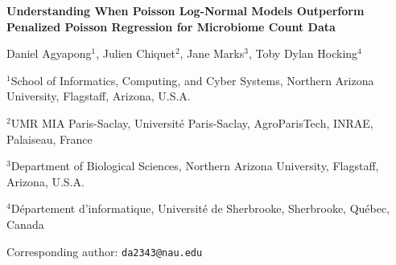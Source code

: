 \documentclass[11pt]{article}
\newcommand{\papertitle}{Understanding When Poisson Log-Normal Models Outperform Penalized Poisson Regression for Microbiome Count Data}
\begin{document}
\begin{center}
{\LARGE\bfseries \papertitle\par}
\vspace{1em}
{\large Daniel Agyapong$^{1}$, Julien Chiquet$^{2}$, Jane Marks$^{3}$, Toby Dylan Hocking$^{4}$\par}
\vspace{0.5em}
{\small $^{1}$School of Informatics, Computing, and Cyber Systems, Northern Arizona University, Flagstaff, Arizona, U.S.A.\par}
{\small $^{2}$UMR MIA Paris-Saclay, Universit\'{e} Paris-Saclay, AgroParisTech, INRAE, Palaiseau, France\par}
{\small $^{3}$Department of Biological Sciences, Northern Arizona University, Flagstaff, Arizona, U.S.A.\par}
{\small $^{4}$D\'{e}partement d'informatique, Universit\'{e} de Sherbrooke, Sherbrooke, Qu\'{e}bec, Canada\par}
\vspace{0.4em}
{\small Corresponding author: \texttt{da2343@nau.edu}\par}
\end{center}
\vspace{0.8em}
\begin{abstract}
Multivariate count models are often justified by their ability to capture latent dependence, but researchers receive little guidance on when this added structure improves on simpler penalized marginal Poisson regression.
We study this question using real microbiome data under a unified held-out evaluation framework.
For count prediction, we compare PLN and GLMNet(Poisson) on 20 datasets spanning 32 to 18,270 samples and 24 to 257 taxa, using held-out Poisson deviance under leave-one-taxon-out prediction with 3-fold sample cross-validation rather than synthetic or in-sample criteria.
For network inference, we compare PLNNetwork and GLMNet(Poisson) neighborhood selection on five publicly available datasets with experimentally validated microbial interaction truth.
PLN outperforms GLMNet(Poisson) on most count-prediction datasets, with gains up to 38 percent.
The primary predictor of the winner is the sample-to-taxon ratio, with mean absolute correlation as the strongest secondary signal and overdispersion as an additional predictor.
PLNNetwork performs best on broad undirected interaction benchmarks, whereas GLMNet(Poisson) is better aligned with local or directional effects.
Taken together, these results provide guidance for choosing between latent multivariate count models and penalized Poisson regression in biological count prediction and interaction recovery.
\end{abstract}
\end{document}
